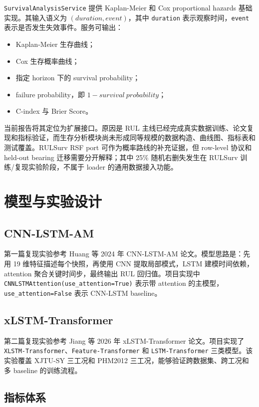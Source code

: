 \documentclass[UTF8,a4paper,12pt]{ctexart}
\newcommand{\code}[1]{\texttt{#1}}
\begin{document}
\code{SurvivalAnalysisService} 提供 Kaplan-Meier 和 Cox proportional hazards 基础实现。其输入语义为 \((duration, event)\)，其中 \code{duration} 表示观察时间，\code{event} 表示是否发生失效事件。服务可输出：

\begin{itemize}
  \item Kaplan-Meier 生存曲线；
  \item Cox 生存概率曲线；
  \item 指定 horizon 下的 survival probability；
  \item failure probability，即 \(1 - survival\ probability\)；
  \item C-index 与 Brier Score。
\end{itemize}

当前报告将其定位为扩展接口。原因是 RUL 主线已经完成真实数据训练、论文复现和指标验证，而生存分析模块尚未形成同等规模的数据构造、曲线图、指标表和测试覆盖。RULSurv RSF port 可作为概率路线的补充证据，但 row-level 协议和 held-out bearing 迁移需要分开解释；其中 25\% 随机右删失发生在 RULSurv 训练/复现实验阶段，不属于 loader 的通用数据接入功能。

\section{模型与实验设计}

\subsection{CNN-LSTM-AM}

第一篇复现实验参考 Huang 等 2024 年 CNN-LSTM-AM 论文。模型思路是：先用 19 维特征描述每个快照，再使用 CNN 提取局部模式，LSTM 建模时间依赖，attention 聚合关键时间步，最终输出 RUL 回归值。项目实现中 \code{CNNLSTMAttention(use\_attention=True)} 表示带 attention 的主模型，\code{use\_attention=False} 表示 CNN-LSTM baseline。

\subsection{xLSTM-Transformer}

第二篇复现实验参考 Jiang 等 2026 年 xLSTM-Transformer 论文。项目实现了 \code{XLSTM-Transformer}、\code{Feature-Transformer} 和 \code{LSTM-Transformer} 三类模型。该实验覆盖 XJTU-SY 三工况和 PHM2012 三工况，能够验证跨数据集、跨工况和多 baseline 的训练流程。

\subsection{指标体系}
\end{document}
